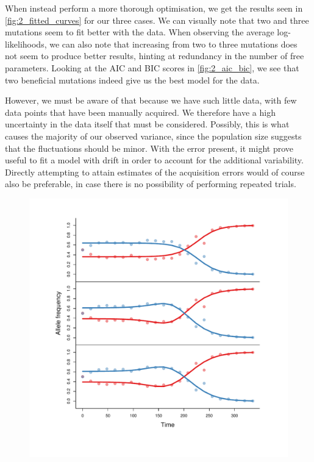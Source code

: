 \documentclass[10pt]{article}\usepackage[]{graphicx}\usepackage[]{color}
\makeatletter
\def\maxwidth{ %
  \ifdim\Gin@nat@width>\linewidth
    \linewidth
  \else
    \Gin@nat@width
  \fi
}
\theoremstyle{plain}
\makeatother
\begin{document}
\begin{multicols*}{2}
When instead perform a more thorough optimisation, we get the results seen in \cref{fig:2_fitted_curves} for our three cases. We can visually note that two and three mutations seem to fit better with the data. When observing the average log-likelihoods, we can also note that increasing from two to three mutations does not seem to produce better results, hinting at redundancy in the number of free parameters.  Looking at the AIC and BIC scores in \cref{fig:2_aic_bic}, we see that two beneficial mutations indeed give us the best model for the data. 

However, we must be aware of that because we have such little data, with few data points that have been manually acquired. We therefore have a high uncertainty in the data itself that must be considered. Possibly, this is what causes the majority of our observed variance, since the population size suggests that the fluctuations should be minor. With the error present, it might prove useful to fit a model with drift in order to account for the additional variability. Directly attempting to attain estimates of the acquisition errors would of course also be preferable, in case there is no possibility of performing repeated trials. 

\begin{Schunk}
\begin{figure}[H]

{\centering \includegraphics[width=\maxwidth]{figure/twocolumn-2_fitted_curves-1} 

}
\end{figure}
\end{Schunk}
\end{multicols*}
\end{document}
